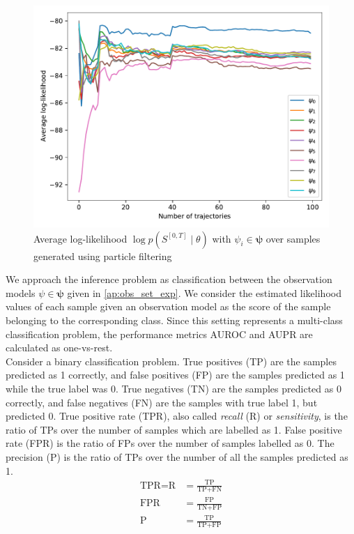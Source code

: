 \begin{figure}[H]
	\begin{center}
		\includegraphics[width=.75\textwidth]{figures/roc_analysis/roc_particleFilter/llh_particleFilter_psi_0}
		\caption[Average log-likelihood in the case of particle filtering]{Average log-likelihood $ \log p(S^{[0,T]} \mid \theta) $ with $ \psi_i \in \symbf{\psi} $ over samples generated using particle filtering}
		\label{fig:llh_particle}
	\end{center}
\end{figure}
We approach the inference problem as classification between the observation models $ \psi \in \symbf{\psi} $ given in \cref{ap:obs_set_exp}. We consider the estimated likelihood values of each sample given an observation model as the score of the sample belonging to the corresponding class. Since this setting represents a multi-class classification problem, the
performance metrics AUROC and AUPR are calculated as one-vs-rest. \\ %
Consider a binary classification problem. True positives (TP) are the samples predicted as 1 correctly, and false positives (FP) are the samples predicted as 1 while the true label was 0. True negatives (TN) are the samples predicted as 0 correctly, and false negatives (FN) are the samples with true label 1, but predicted 0. True positive rate (TPR), also called \textit{recall} (R) or \textit{sensitivity}, is the ratio of TPs over the number of samples which are labelled as 1. False positive rate (FPR) is the ratio of FPs over the number of samples labelled as 0. The precision (P) is the ratio of TPs over the number of all the samples predicted as 1.
\begin{align}
\text{TPR} = \text{R} &= \frac{\text{TP}}{\text{TP} + \text{FN}} \\
\text{FPR} &= \frac{\text{FP}}{\text{TN} + \text{FP}} \\
\text{P} &= \frac{\text{TP}}{\text{TP} + \text{FP}}
\end{align}
